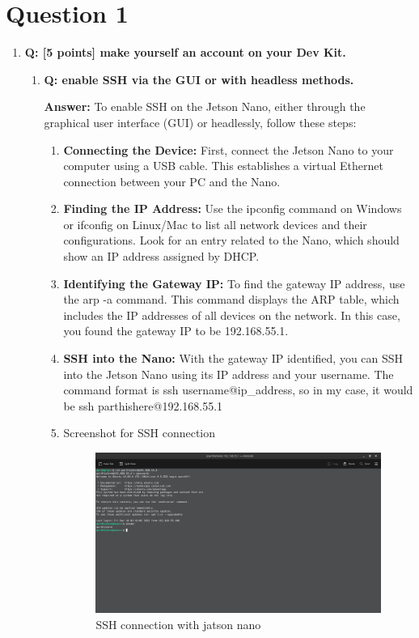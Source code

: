 \documentclass[a4paper,11pt]{article}%
\newenvironment{qanda}{\setlength{\parindent}{0pt}}{\bigskip}
\newcommand{\Q}{\bigskip\bfseries Q: }
\newcommand{\A}{\par\textbf{Answer: } \normalfont}
\begin{document}
\pagebreak
\begin{qanda}
	\section{Question 1}
	\begin{enumerate}
		\item[] \Q [5 points] make yourself an account on your Dev Kit.
			\begin{enumerate}
				\item \Q enable SSH via the GUI or with
				      headless methods.

				      \A To enable SSH on the Jetson Nano, either through the graphical user interface (GUI) or headlessly, follow these steps:
				      \begin{enumerate}
					      \item \textbf{Connecting the Device:} First, connect the Jetson Nano to your computer using a USB cable. This establishes a virtual Ethernet connection between your PC and the Nano.
					      \item \textbf{Finding the IP Address:} Use the ipconfig command on Windows or ifconfig on Linux/Mac to list all network devices and their configurations. Look for an entry related to the Nano, which should show an IP address assigned by DHCP.
					      \item \textbf{Identifying the Gateway IP:} To find the gateway IP address, use the arp -a command. This command displays the ARP table, which includes the IP addresses of all devices on the network. In this case, you found the gateway IP to be 192.168.55.1.
					      \item \textbf{SSH into the Nano:} With the gateway IP identified, you can SSH into the Jetson Nano using its IP address and your username. The command format is ssh username@ip\_address, so in my case, it would be ssh parthishere@192.168.55.1
					      \item Screenshot for SSH connection
					            \begin{figure}[H]
						            \centering
						            \includegraphics[scale=0.32]{figures/ssh.png}
						            \caption{SSH connection with jatson nano}
					            \end{figure}


\end{enumerate}
\end{enumerate}
\end{enumerate}
\end{qanda}
\end{document}
